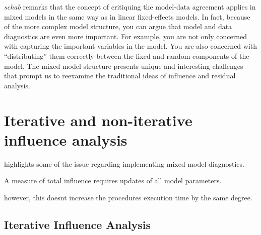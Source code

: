 \documentclass[Main.tex]{subfiles}
\begin{document}
		\emph{schab} remarks that the concept of critiquing the model-data agreement applies in mixed models in the same way as in linear
		fixed-effects models. In fact, because of the more complex model structure, you can argue that model and
		data diagnostics are even more important. For example, you are not only concerned with capturing the
		important variables in the model. You are also concerned with ``distributing” them correctly between the
		fixed and random components of the model. The mixed model structure presents unique and interesting
		challenges that prompt us to reexamine the traditional ideas of influence and residual analysis.
		
		

		

		
		
		
		
		\newpage
		\section{Iterative and non-iterative influence analysis} %
		\citet{schabenberger} highlights some of the issue regarding implementing mixed model diagnostics.
		
		A measure of total influence requires updates of all model parameters.
		
		however, this doesnt increase the procedures execution time by the same degree.
		\subsection{Iterative Influence Analysis}
		
\end{document}
